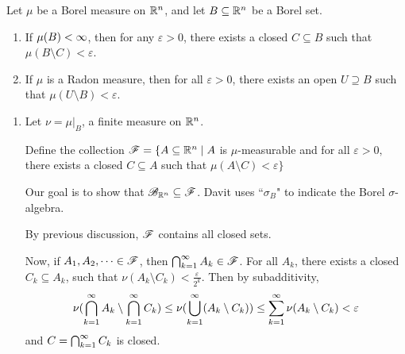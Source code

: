 \documentclass[x11names,reqno,14pt]{extarticle}
\newcommand{\seq}[1]{_{#1 = 1}^\oo}
\newcommand{\bigcupk}{\bigcup\seq{k}}
\newcommand{\bigcapk}{\bigcap\seq{k}}
\begin{document}
\thm Let $\mu$ be a Borel measure on $\mathbb{R}^n$, and let $B \subseteq \mathbb{R}^n$ be a Borel set. 

\begin{enumerate}

\item If $\mu(B)<\infty$, then for any $\varepsilon>0$, there exists a closed $C \subseteq B$ such that $\mu(B\setminus C) < \varepsilon$. 

\item If $\mu$ is a Radon measure, then for all $\varepsilon>0$, there exists an open $U \supseteq B$ such that $\mu(U\setminus B) < \varepsilon$. 

\end{enumerate}

\proof

\begin{enumerate}

\item Let $\nu = \mu|_B$, a finite measure on $\mathbb{R}^n$. 

Define the collection $\mathscr{F} = \{A\subseteq\mathbb{R}^n\mid A$ is $\mu$-measurable and for all $\varepsilon > 0, $ there exists a closed $C \subseteq  A$ such that $\mu(A\setminus C) < \varepsilon \}$

Our goal is to show that $\mathscr{B}_{\mathbb{R}^n}\subseteq\mathscr{F}$. Davit uses ``$\sigma_B$" to indicate the Borel $\sigma$-algebra. 

By previous discussion, $\mathscr{F}$ contains all closed sets. 

Now, if $A_1, A_2, \dots \in \mathscr{F}$, then $\bigcapk A_k\in\ms{F}$. For all $A_k$, there exists a closed $C_k \subseteq A_k$, such that $\nu(A_k\setminus C_k) < \frac{\varepsilon}{2^k}$. Then by subadditivity, 
\[
\nu(\bigcapk A_k \setminus \bigcapk C_k) \leq \nu(\bigcupk(A_k \setminus C_k)) \leq \sum\seq{k}\nu(A_k\setminus C_k) < \varepsilon
\]
and $C = \bigcapk C_k$ is closed. 


\end{enumerate}


 
\end{document}
